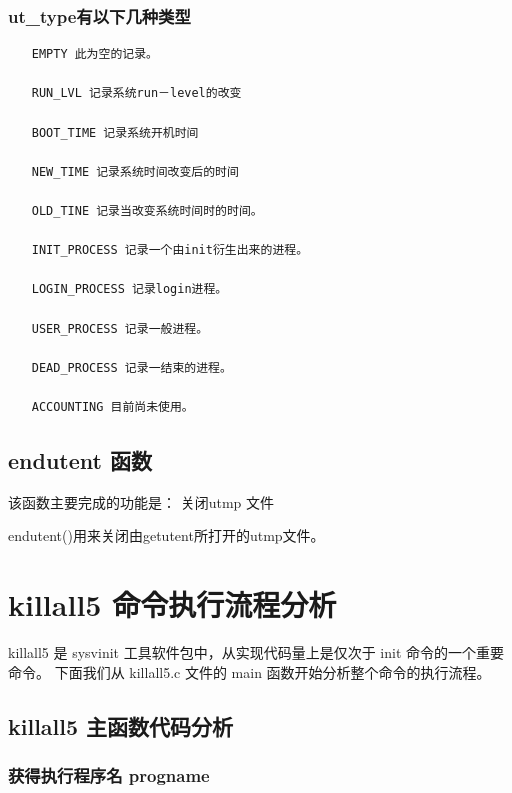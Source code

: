 \subsubsection{ut\_type有以下几种类型}

{\begin{shaded}\begin{verbatim}
　　EMPTY 此为空的记录。

　　RUN_LVL 记录系统run－level的改变

　　BOOT_TIME 记录系统开机时间

　　NEW_TIME 记录系统时间改变后的时间

　　OLD_TINE 记录当改变系统时间时的时间。

　　INIT_PROCESS 记录一个由init衍生出来的进程。

　　LOGIN_PROCESS 记录login进程。

　　USER_PROCESS 记录一般进程。

　　DEAD_PROCESS 记录一结束的进程。

　　ACCOUNTING 目前尚未使用。
\end{verbatim}\end{shaded}}
\subsection{endutent 函数}

该函数主要完成的功能是： 关闭utmp 文件

endutent()用来关闭由getutent所打开的utmp文件。

\section{killall5 命令执行流程分析}

killall5 是 sysvinit 工具软件包中，从实现代码量上是仅次于 init
命令的一个重要命令。 下面我们从 killall5.c 文件的 main
函数开始分析整个命令的执行流程。

\subsection{killall5 主函数代码分析}

\subsubsection{获得执行程序名 progname}

